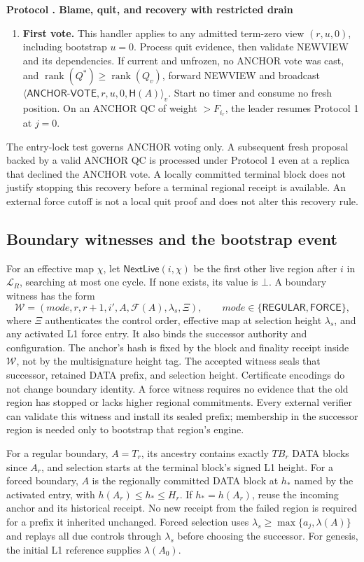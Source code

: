 \documentclass[11pt,a4paper]{article}
\newcommand{\RR}[1]{{\color{rrRed}#1}}
\newcommand{\FC}{\mathcal F}
\newcommand{\Hash}{\mathsf H}
\newcommand{\rank}{\operatorname{rank}}
\newcommand{\tagg}[1]{\ensuremath{\mathsf{#1}}}
\newcounter{protocol}
\newenvironment{protocol}[2]{\refstepcounter{protocol}\label{#1}
\begin{mdframed}[nobreak=true,linewidth=.6pt,skipabove=8pt,skipbelow=8pt,
innertopmargin=7pt,innerbottommargin=7pt]\small
\textbf{Protocol \theprotocol. #2}\par\smallskip}{\end{mdframed}}
\begin{document}
\begin{protocol}{alg:recovery}{Blame, quit, and recovery with restricted drain}
\begin{enumerate}[label=\textbf{\arabic*)},itemsep=5pt]
\item \textbf{First vote.} \RR{This handler applies to any admitted
term-zero view $(r,u,0)$, including bootstrap $u=0$.} Process quit evidence,
then validate NEWVIEW and its dependencies. If current and unfrozen,
no ANCHOR vote was cast, and $\rank(Q^*)\ge\rank(Q_v)$, forward NEWVIEW
and broadcast
$\langle\tagg{ANCHOR\mbox{-}VOTE},r,u,0,\Hash(A)\rangle_v$.
Start no timer and consume no fresh position. On an ANCHOR QC
\RR{of weight $>F_{i_r}$}, the leader resumes Protocol 1 at $j=0$.
\end{enumerate}
\end{protocol}

The entry-lock test governs ANCHOR voting only. A subsequent fresh
proposal backed by a valid ANCHOR QC is processed under Protocol 1 even
at a replica that declined the ANCHOR vote. A locally committed terminal
block does not justify stopping this recovery before a terminal regional
receipt is available. An external force cutoff is not a local quit proof
and does not alter this recovery rule.

\subsection{Boundary witnesses and the bootstrap event}
\label{sec:boundary}
For an effective map $\chi$, let $\tagg{NextLive}(i,\chi)$ be the first
other live region after $i$ in $\mathcal L_R$, searching at most one cycle.
If none exists, its value is $\bot$. A boundary witness has the form
\[
 \mathcal W=(\mathit{mode},r,r+1,i',A,\FC(A),\lambda_s,\Xi),
 \qquad \mathit{mode}\in\{\tagg{REGULAR},\tagg{FORCE}\},
\]
where $\Xi$ authenticates the control order, effective map at selection
height $\lambda_s$, and any activated L1 force entry. It also
binds the successor authority and configuration. The anchor's hash is
fixed by the block and finality receipt inside $\mathcal W$, not by the
multisignature height tag. The accepted witness seals that successor,
retained DATA prefix, and selection height. Certificate encodings do not
change boundary identity. A force witness requires no evidence that the
old region has stopped or lacks higher regional commitments.
Every external verifier can validate this witness and install its sealed
prefix; membership in the successor region is needed only to bootstrap
that region's engine.

For a regular boundary, $A=T_r$, its ancestry contains exactly $TB_r$
DATA blocks since $A_r$, and selection starts at the terminal block's
signed L1 height. For a forced boundary, $A$ is the regionally committed DATA block
at $h_*$ named by the activated entry, with
$h(A_r)\le h_*\le H_r$. If $h_*=h(A_r)$, reuse the incoming anchor and
its historical receipt. No new receipt from the failed region is required
for a prefix it inherited unchanged.
Forced selection uses $\lambda_s\ge\max\{a_j,\lambda(A)\}$ and replays
all due controls through $\lambda_s$ before choosing the successor.
For genesis, the initial L1 reference supplies $\lambda(A_0)$.
\end{document}
